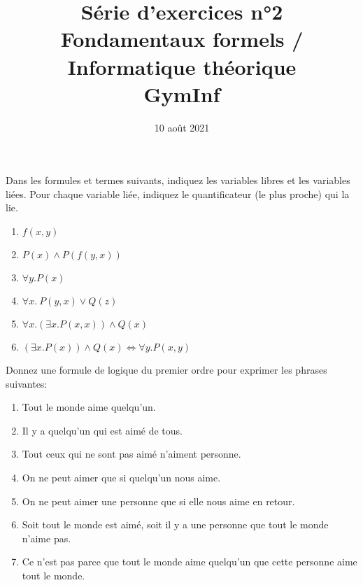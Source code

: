 \documentclass[12pt,french,a4paper]{article}
\begin{document}
\title{\vspace{-2cm}Série d'exercices n°2\\\large{Fondamentaux formels / Informatique théorique\\GymInf}}
\date{\vspace{-1cm}10 août 2021}

\maketitle


\begin{question}

Dans les formules et termes suivants, indiquez les variables libres et les variables liées.
Pour chaque variable liée, indiquez le quantificateur (le plus proche) qui la lie.

\begin{enumerate}
\item $f(x, y)$
\item $P(x) \wedge P(f(y, x))$
\item $\forall y. P(x)$
\item $\forall x.\ P(y, x) \vee Q(z)$
\item $\forall x. (\exists x. P(x, x)) \wedge Q(x)$
\item $(\exists x. P(x)) \wedge Q(x) \iff \forall y. P(x, y)$
\end{enumerate}

\end{question}

\begin{question}

Donnez une formule de logique du premier ordre pour exprimer les phrases suivantes:
\begin{enumerate}
\item Tout le monde aime quelqu'un.
\item Il y a quelqu'un qui est aimé de tous.
\item Tout ceux qui ne sont pas aimé n'aiment personne.
\item On ne peut aimer que si quelqu'un nous aime.
\item On ne peut aimer une personne que si elle nous aime en retour.
\item Soit tout le monde est aimé, soit il y a une personne que tout le monde n'aime pas.
\item Ce n'est pas parce que tout le monde aime quelqu'un que cette personne aime tout le monde.
\end{enumerate}
\end{question}
\end{document}
